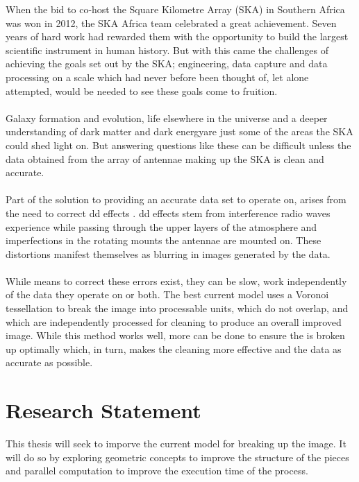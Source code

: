 When the bid to co-host the Square Kilometre Array (SKA) in Southern Africa was won in 2012, the SKA Africa team celebrated a great achievement. Seven years of hard work had rewarded them with the opportunity to build the largest scientific instrument in human history. But with this came the challenges of achieving the goals set out by the SKA; engineering, data capture and data processing on a scale which had never before been thought of, let alone attempted, would be needed to see these goals come to fruition.
\\
\\
Galaxy formation and evolution, life elsewhere in the universe and a deeper understanding of dark matter and dark energy\footnotemark are just some of the areas the SKA could shed light on. But answering questions like these can be difficult unless the data obtained from the array of antennae making up the SKA is clean and accurate.
\\
\\
Part of the solution to providing an accurate data set to operate on, arises from the need to correct \gls{dd} effects \citep{smirnov2011revisiting}. \gls{dd} effects stem from interference radio waves experience while passing through the upper layers of the atmosphere and imperfections in the rotating mounts the antennae are mounted on. These distortions manifest themselves as blurring in images generated by the data.
\\
\\
While means to correct these errors exist, they can be slow, work independently of the data they operate on or both. The best current model uses a Voronoi tessellation \citep{okabe2009spatial} to break the image into processable units, which do not overlap, and which are independently processed for cleaning to produce an overall improved image. While this method works well, more can be done to ensure the is broken up optimally which, in turn, makes the cleaning more effective and the data as accurate as possible.
\section{Research Statement}
This thesis will seek to imporve the current model for breaking up the image. It will do so by exploring geometric concepts to improve the structure of the pieces and parallel computation to improve the execution time of the process.
